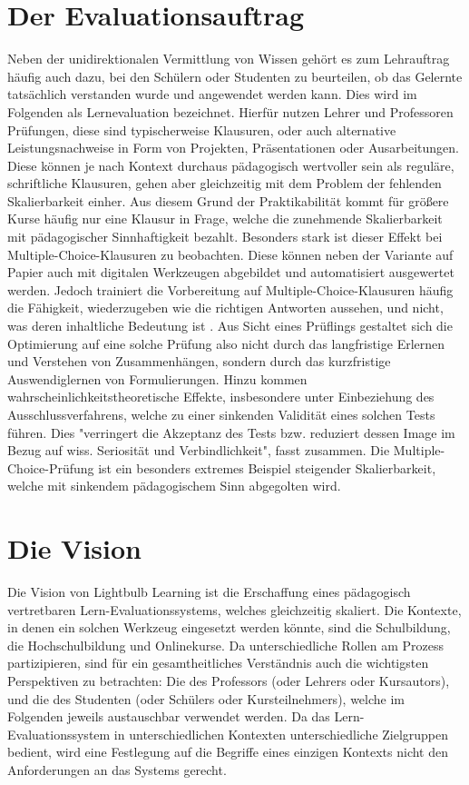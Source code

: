 \section{Der Evaluationsauftrag}
\label{sec:eval}
Neben der unidirektionalen Vermittlung von Wissen gehört es zum Lehrauftrag häufig auch dazu, bei den Schülern oder Studenten zu beurteilen, ob das Gelernte tatsächlich verstanden wurde und angewendet werden kann. Dies wird im Folgenden als Lernevaluation bezeichnet. Hierfür nutzen Lehrer und Professoren Prüfungen, diese sind typischerweise Klausuren, oder auch alternative Leistungsnachweise in Form von Projekten, Präsentationen oder Ausarbeitungen. Diese können je nach Kontext durchaus pädagogisch wertvoller sein als reguläre, schriftliche Klausuren, gehen aber gleichzeitig mit dem Problem der fehlenden Skalierbarkeit einher. Aus diesem Grund der Praktikabilität kommt für größere Kurse häufig nur eine Klausur in Frage, welche die zunehmende Skalierbarkeit mit pädagogischer Sinnhaftigkeit bezahlt. Besonders stark ist dieser Effekt bei Multiple-Choice-Klausuren zu beobachten. Diese können neben der Variante auf Papier auch mit digitalen Werkzeugen abgebildet und automatisiert ausgewertet werden. Jedoch trainiert die Vorbereitung auf Multiple-Choice-Klausuren häufig die Fähigkeit, wiederzugeben wie die richtigen Antworten aussehen, und nicht, was deren inhaltliche Bedeutung ist \cite{Dorsch2022}. Aus Sicht eines Prüflings gestaltet sich die Optimierung auf eine solche Prüfung also nicht durch das langfristige Erlernen und Verstehen von Zusammenhängen, sondern durch das kurzfristige Auswendiglernen von Formulierungen. Hinzu kommen wahrscheinlichkeitstheoretische Effekte, insbesondere unter Einbeziehung des Ausschlussverfahrens, welche zu einer sinkenden Validität eines solchen Tests führen. Dies "verringert die Akzeptanz des Tests bzw. reduziert dessen Image im Bezug auf wiss. Seriosität und Verbindlichkeit", fasst \cite[][unter (4)]{Dorsch2022} zusammen. Die Multiple-Choice-Prüfung ist ein besonders extremes Beispiel steigender Skalierbarkeit, welche mit sinkendem pädagogischem Sinn abgegolten wird.

\section{Die Vision}
Die Vision von Lightbulb Learning ist die Erschaffung eines pädagogisch vertretbaren Lern-Evaluationssystems, welches gleichzeitig skaliert. Die Kontexte, in denen ein solchen Werkzeug eingesetzt werden könnte, sind die Schulbildung, die Hochschulbildung und Onlinekurse. Da unterschiedliche Rollen am Prozess partizipieren, sind für ein gesamtheitliches Verständnis auch die wichtigsten Perspektiven zu betrachten: Die des Professors (oder Lehrers oder Kursautors), und die des Studenten (oder Schülers oder Kursteilnehmers), welche im Folgenden jeweils austauschbar verwendet werden. Da das Lern-Evaluationssystem in unterschiedlichen Kontexten unterschiedliche Zielgruppen bedient, wird eine Festlegung auf die Begriffe eines einzigen Kontexts nicht den Anforderungen an das Systems gerecht.

